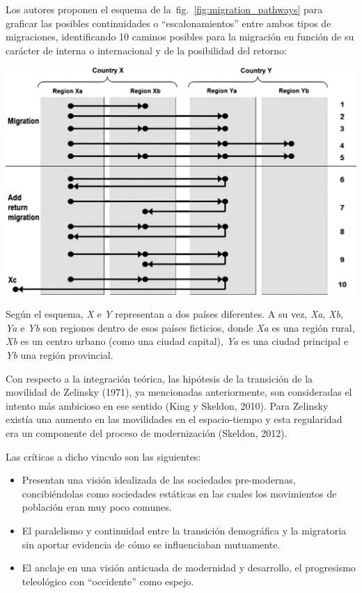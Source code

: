 \documentclass[12pt,spanish,]{article}
\let\origfigure\figure
\let\endorigfigure\endfigure
\renewenvironment{figure}[1][2] {
    \expandafter\origfigure\expandafter[H]
} {
    \endorigfigure
}
\begin{document}
Los autores proponen el esquema de la~fig.~\ref{fig:migration_pathways}
para graficar las posibles continuidades o ``escalonamientos'' entre
ambos tipos de migraciones, identificando 10 caminos posibles para la
migración en función de su carácter de interna o internacional y de la
posibilidad del retorno:

\begin{figure}
\hypertarget{fig:migration_pathways}{%
\centering
\includegraphics{./tex2pdf.-8c1f0593c1a83dbe/a6bbc6a663a610e2b1631c3e3acad8b417f7424a.jpg}
\caption{Los 10 caminos de las migraciones (``migration pathways'')
identificados por King y Skeldon (2010).}\label{fig:migration_pathways}
}
\end{figure}

Según el esquema, \emph{X} e \emph{Y} representan a dos países
diferentes. A su vez, \emph{Xa}, \emph{Xb}, \emph{Ya} e \emph{Yb} son
regiones dentro de esos países ficticios, donde \emph{Xa} es una región
rural, \emph{Xb} es un centro urbano (como una ciudad capital),
\emph{Ya} es una ciudad principal e \emph{Yb} una región provincial.

Con respecto a la integración teórica, las hipótesis de la transición de
la movilidad de Zelinsky (1971), ya mencionadas anteriormente, son
consideradas el intento más ambicioso en ese sentido (King y Skeldon,
2010). Para Zelinsky existía una aumento en las movilidades en el
espacio-tiempo y esta regularidad era un componente del proceso de
modernización (Skeldon, 2012).

Las críticas a dicho vinculo son las siguientes:

\begin{itemize}
\item
  Presentan una visión idealizada de las sociedades pre-modernas,
  concibiéndolas como sociedades estáticas en las cuales los movimientos
  de población eran muy poco comunes.
\item
  El paralelismo y continuidad entre la transición demográfica y la
  migratoria sin aportar evidencia de cómo se influenciaban mutuamente.
\item
  El anclaje en una visión anticuada de modernidad y desarrollo, el
  progresismo teleológico con ``occidente'' como espejo.
\end{itemize}
\end{document}
